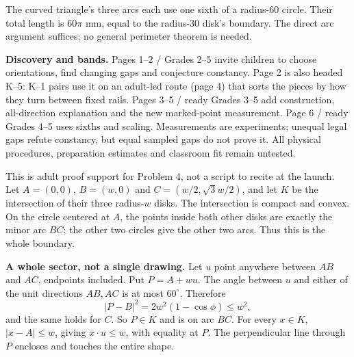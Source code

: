 \documentclass[11pt,letterpaper]{article}
\newcommand{\heading}[1]{\par\vspace{2pt}{\large\bfseries #1}\par}
\newcommand{\lead}[1]{\textbf{#1}}
\begin{document}
The curved triangle's three arcs each use one sixth of a radius-60 circle. Their total length is $60\pi$ mm, equal to the radius-30 disk's boundary. The direct arc argument suffices; no general perimeter theorem is needed.

\lead{Discovery and bands.} Pages 1--2 / Grades 2--5 invite children to choose orientations, find changing gaps and conjecture constancy. Page 2 is also headed K--5: K--1 pairs use it on an adult-led route (page 4) that sorts the pieces by how they turn between fixed rails. Pages 3--5 / ready Grades 3--5 add construction, all-direction explanation and the new marked-point measurement. Page 6 / ready Grades 4--5 uses sixths and scaling. Measurements are experiments; unequal legal gaps refute constancy, but equal sampled gaps do not prove it. All physical procedures, preparation estimates and classroom fit remain untested.

\newpage
\heading{Why the exact curved triangle has width $w$}
This is adult proof support for Problem 4, not a script to recite at the launch. Let $A=(0,0)$, $B=(w,0)$ and $C=(w/2,\sqrt3w/2)$, and let $K$ be the intersection of their three radius-$w$ disks. The intersection is compact and convex. On the circle centered at $A$, the points inside both other disks are exactly the minor arc $BC$; the other two circles give the other two arcs. Thus this is the whole boundary.

\lead{A whole sector, not a single drawing.} Let $u$ point anywhere between $AB$ and $AC$, endpoints included. Put $P=A+wu$. The angle between $u$ and either of the unit directions $AB,AC$ is at most $60^\circ$. Therefore
\[
 |P-B|^2=2w^2(1-\cos\phi)\le w^2,
\]
and the same holds for $C$. So $P\in K$ and is on arc $BC$. For every $x\in K$, $|x-A|\le w$, giving $x\cdot u\le w$, with equality at $P$. The perpendicular line through $P$ encloses and touches the entire shape.
\end{document}
